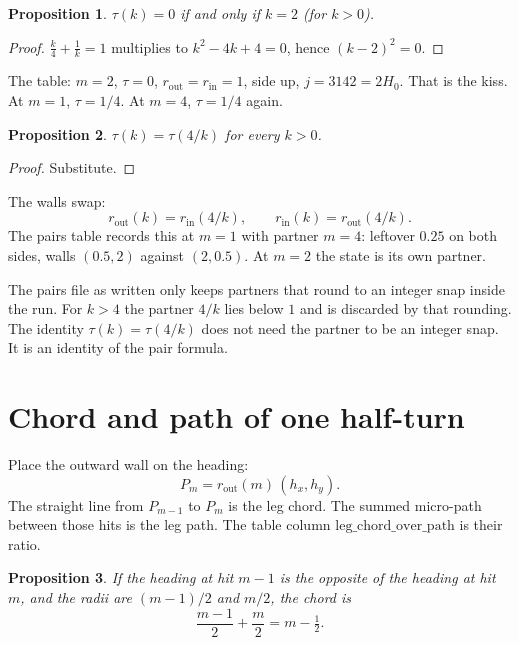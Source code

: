 \documentclass[10pt,a4paper]{article}
\theoremstyle{plain}
\newtheorem{proposition}{Proposition}
\theoremstyle{definition}
\theoremstyle{remark}
\begin{document}
\begin{proposition}
\label{prop:kiss}
\(\tau(k)=0\) if and only if \(k=2\) (for \(k>0\)).
\end{proposition}

\begin{proof}
\(\frac k4+\frac1k=1\) multiplies to \(k^2-4k+4=0\), hence \((k-2)^2=0\).
\end{proof}

The table: \(m=2\), \(\tau=0\), \(r_{\mathrm{out}}=r_{\mathrm{in}}=1\), side up, \(j=3142=2H_0\).
That is the kiss.
At \(m=1\), \(\tau=1/4\).
At \(m=4\), \(\tau=1/4\) again.

\begin{proposition}
\label{prop:fold}
\(\tau(k)=\tau(4/k)\) for every \(k>0\).
\end{proposition}

\begin{proof}
Substitute.
\end{proof}

The walls swap:
\[
r_{\mathrm{out}}(k)=r_{\mathrm{in}}(4/k),\qquad
r_{\mathrm{in}}(k)=r_{\mathrm{out}}(4/k).
\]
The pairs table records this at \(m=1\) with partner \(m=4\): leftover \(0.25\) on both sides, walls \((0.5,2)\) against \((2,0.5)\).
At \(m=2\) the state is its own partner.

The pairs file as written only keeps partners that round to an integer snap inside the run.
For \(k>4\) the partner \(4/k\) lies below \(1\) and is discarded by that rounding.
The identity \(\tau(k)=\tau(4/k)\) does not need the partner to be an integer snap.
It is an identity of the pair formula.

\section{Chord and path of one half-turn}

Place the outward wall on the heading:
\[
P_m=r_{\mathrm{out}}(m)\,(h_x,h_y).
\]
The straight line from \(P_{m-1}\) to \(P_m\) is the leg chord.
The summed micro-path between those hits is the leg path.
The table column \(\mathrm{leg\_chord\_over\_path}\) is their ratio.

\begin{proposition}
If the heading at hit \(m-1\) is the opposite of the heading at hit \(m\), and the radii are \((m-1)/2\) and \(m/2\), the chord is
\[
\frac{m-1}{2}+\frac m2=m-\tfrac12.
\]
\end{proposition}
\end{document}
